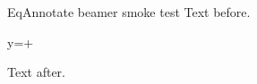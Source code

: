 \documentclass{beamer}
\begin{document}
\begin{frame}{EqAnnotate beamer smoke test}
Text before.
\begin{annotatedequation}
y=+
\end{annotatedequation}
Text after.
\end{frame}
\end{document}
